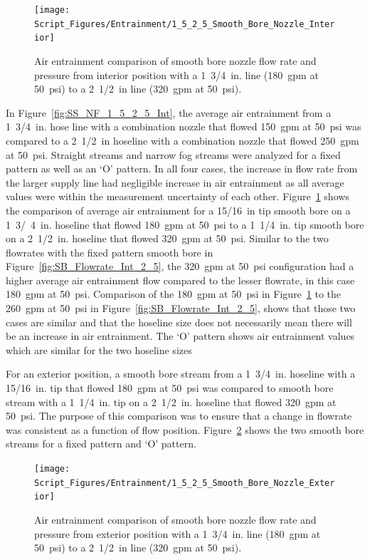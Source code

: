 \documentclass[12pt,oneside]{book}
\begin{document}
\begin{figure}[!ht]
\centering
\texttt{[image: Script\_Figures/Entrainment/1\_5\_2\_5\_Smooth\_Bore\_Nozzle\_Interior]}
\caption[Air Entrainment Comparison of Interior Smooth Bore Nozzle from 1~3/4~in Line to 2~1/2~in. Line]{Air entrainment comparison of smooth bore nozzle flow rate and pressure from interior position with a 1~3/4~in. line (180~gpm at 50~psi) to a 2~1/2~in line (320~gpm at 50~psi).}
\label{fig:SB_1_5_2_5_Int}
\end{figure}

In Figure~\ref{fig:SS_NF_1_5_2_5_Int}, the average air entrainment from a 1~3/4~in. hose line with a combination nozzle that flowed 150~gpm at 50~psi was compared to a 2~1/2~in hoseline with a combination nozzle that flowed 250~gpm at 50~psi. Straight streams and narrow fog streams were analyzed for a fixed pattern as well as an `O' pattern. In all four cases, the increase in flow rate from the larger supply line had negligible increase in air entrainment as all average values were within the measurement uncertainty of each other. Figure~\ref{fig:SB_1_5_2_5_Int} shows the comparison of average air entrainment for a 15/16~in tip smooth bore on a 1~3/~4~in. hoseline that flowed 180~gpm at 50~psi to a 1~1/4~in. tip smooth bore on a 2~1/2~in. hoseline that flowed 320~gpm at 50~psi. Similar to the two flowrates with the fixed pattern smooth bore in Figure~\ref{fig:SB_Flowrate_Int_2_5}, the 320~gpm at 50~psi configuration had a higher average air entrainment flow compared to the lesser flowrate, in this case 180~gpm at 50~psi. Comparison of the 180~gpm at 50~psi in Figure~\ref{fig:SB_1_5_2_5_Int} to the 260~gpm at 50~psi in Figure~\ref{fig:SB_Flowrate_Int_2_5}, shows that those two cases are similar and that the hoseline size does not necessarily mean there will be an increase in air entrainment. The `O' pattern shows air entrainment values which are similar for the two hoseline sizes

For an exterior position, a smooth bore stream from a 1~3/4~in. hoseline with a 15/16~in. tip that flowed 180~gpm at 50~psi was compared to smooth bore stream with a 1~1/4~in. tip on a 2~1/2~in. hoseline that flowed 320~gpm at 50~psi. The purpose of this comparison was to ensure that a change in flowrate was consistent as a function of flow position. Figure~\ref{fig:SB_Flowrate_Hoseline_Exterior} shows the two smooth bore streams for a fixed pattern and `O' pattern.

\begin{figure}[!ht]
\centering
\texttt{[image: Script\_Figures/Entrainment/1\_5\_2\_5\_Smooth\_Bore\_Nozzle\_Exterior]}
\caption[Air Entrainment Comparison of Exterior Smooth Bore Nozzle from 1~3/4~in Line to 2~1/2~in. Line]{Air entrainment comparison of smooth bore nozzle flow rate and pressure from exterior position with a 1~3/4~in. line (180~gpm at 50~psi) to a 2~1/2~in line (320~gpm at 50~psi).}
\label{fig:SB_Flowrate_Hoseline_Exterior}
\end{figure}
\end{document}
